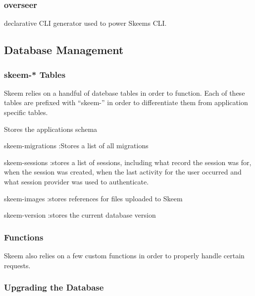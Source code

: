 \documentclass[
  12pt,
]{article}
\providecommand{\tightlist}{%
  \setlength{\itemsep}{0pt}\setlength{\parskip}{0pt}}
\begin{document}
\hypertarget{overseer}{%
\subsubsection{overseer}\label{overseer}}

declarative CLI generator used to power Skeems CLI.

\hypertarget{database-management}{%
\subsection{Database Management}\label{database-management}}

\hypertarget{skeem--tables}{%
\subsubsection{skeem-* Tables}\label{skeem--tables}}

Skeem relies on a handful of datebase tables in order to function. Each
of these tables are prefixed with ``skeem-'' in order to differentiate
them from application specific tables.

\begin{description}
\tightlist
\item[skeem-schema]
Stores the applications schema
\end{description}

skeem-migrations :Stores a list of all migrations

skeem-sessions :stores a list of sessions, including what record the
session was for, when the session was created, when the last activity
for the user occurred and what session provider was used to
authenticate.

skeem-images :stores references for files uploaded to Skeem

skeem-version :stores the current database version

\hypertarget{functions}{%
\subsubsection{Functions}\label{functions}}

Skeem also relies on a few custom functions in order to properly handle
certain requests.

\hypertarget{upgrading-the-database}{%
\subsubsection{Upgrading the Database}\label{upgrading-the-database}}
\end{document}
